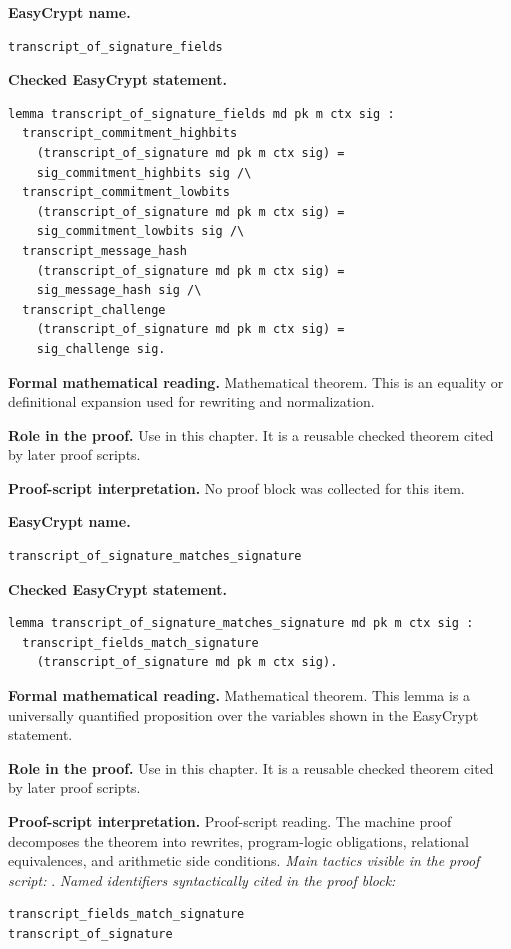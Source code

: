 \begin{formaltheorem}
\noindent\textbf{EasyCrypt name.}
\begin{lstlisting}[language=EasyCrypt,basicstyle=\ttfamily\scriptsize]
transcript_of_signature_fields
\end{lstlisting}
\noindent\textbf{Checked EasyCrypt statement.}
\begin{lstlisting}[language=EasyCrypt,basicstyle=\ttfamily\scriptsize]
lemma transcript_of_signature_fields md pk m ctx sig :
  transcript_commitment_highbits
    (transcript_of_signature md pk m ctx sig) =
    sig_commitment_highbits sig /\
  transcript_commitment_lowbits
    (transcript_of_signature md pk m ctx sig) =
    sig_commitment_lowbits sig /\
  transcript_message_hash
    (transcript_of_signature md pk m ctx sig) =
    sig_message_hash sig /\
  transcript_challenge
    (transcript_of_signature md pk m ctx sig) =
    sig_challenge sig.
\end{lstlisting}
\noindent\textbf{Formal mathematical reading.}
Mathematical theorem. This is an equality or definitional expansion used for rewriting and normalization.

\noindent\textbf{Role in the proof.}
Use in this chapter. It is a reusable checked theorem cited by later proof scripts.

\noindent\textbf{Proof-script interpretation.}
No proof block was collected for this item.

\end{formaltheorem}

\begin{formaltheorem}
\noindent\textbf{EasyCrypt name.}
\begin{lstlisting}[language=EasyCrypt,basicstyle=\ttfamily\scriptsize]
transcript_of_signature_matches_signature
\end{lstlisting}
\noindent\textbf{Checked EasyCrypt statement.}
\begin{lstlisting}[language=EasyCrypt,basicstyle=\ttfamily\scriptsize]
lemma transcript_of_signature_matches_signature md pk m ctx sig :
  transcript_fields_match_signature
    (transcript_of_signature md pk m ctx sig).
\end{lstlisting}
\noindent\textbf{Formal mathematical reading.}
Mathematical theorem. This lemma is a universally quantified proposition over the variables shown in the EasyCrypt statement.

\noindent\textbf{Role in the proof.}
Use in this chapter. It is a reusable checked theorem cited by later proof scripts.

\noindent\textbf{Proof-script interpretation.}
Proof-script reading. The machine proof decomposes the theorem into rewrites, program-logic obligations, relational equivalences, and arithmetic side conditions.
\emph{Main tactics visible in the proof script:} .
\emph{Named identifiers syntactically cited in the proof block:}
\begin{lstlisting}[language=EasyCrypt,basicstyle=\ttfamily\scriptsize]
transcript_fields_match_signature
transcript_of_signature
\end{lstlisting}

\end{formaltheorem}

